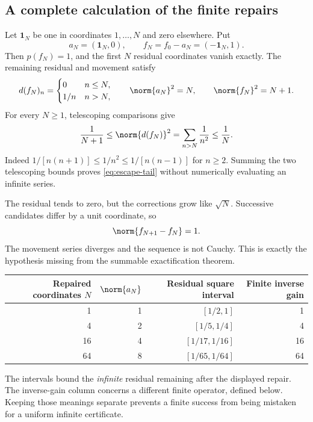 \subsection{A complete calculation of the finite repairs}
Let \(\mathbf 1_N\) be one in coordinates \(1,\ldots,N\) and zero elsewhere. Put
\[
 a_N=(\mathbf 1_N,0),\qquad f_N=f_0-a_N=(-\mathbf 1_N,1).
\]
Then \(p(f_N)=1\), and the first \(N\) residual coordinates vanish exactly. The remaining residual and movement satisfy
\[
 d(f_N)_n=\begin{cases}0&n\le N,\\1/n&n>N,\end{cases}
 \qquad \norm{a_N}^2=N,\qquad \norm{f_N}^2=N+1.
\]
For every \(N\ge1\), telescoping comparisons give
\begin{equation}\label{eq:escape-tail}
 \frac1{N+1}\le\norm{d(f_N)}^2
 =\sum_{n>N}\frac1{n^2}\le\frac1N.
\end{equation}
Indeed \(1/[n(n+1)]\le1/n^2\le1/[n(n-1)]\) for \(n\ge2\). Summing the two telescoping bounds proves \eqref{eq:escape-tail} without numerically evaluating an infinite series.

The residual tends to zero, but the corrections grow like \(\sqrt N\). Successive candidates differ by a unit coordinate, so
\[
 \norm{f_{N+1}-f_N}=1.
\]
The movement series diverges and the sequence is not Cauchy. This is exactly the hypothesis missing from the summable exactification theorem.

\begin{center}
\begin{tabular}{@{}rrrr@{}}
\toprule Repaired coordinates \(N\) & \(\norm{a_N}\) & Residual square interval & Finite inverse gain\\\midrule
1 & 1 & \([1/2,1]\) & 1\\
4 & 2 & \([1/5,1/4]\) & 4\\
16 & 4 & \([1/17,1/16]\) & 16\\
64 & 8 & \([1/65,1/64]\) & 64\\\bottomrule
\end{tabular}
\end{center}
The intervals bound the \emph{infinite} residual remaining after the displayed repair. The inverse-gain column concerns a different finite operator, defined below. Keeping those meanings separate prevents a finite success from being mistaken for a uniform infinite certificate.


